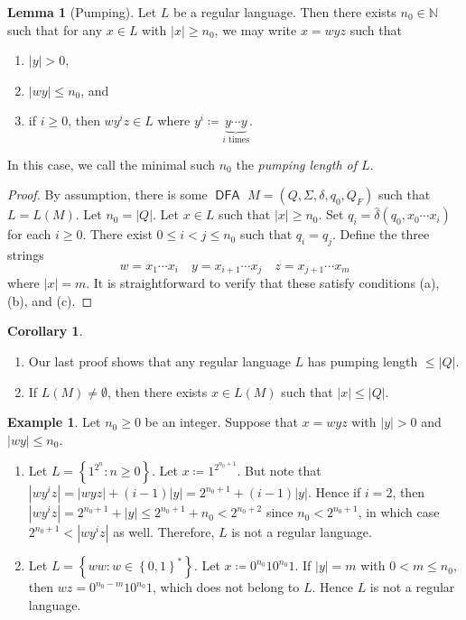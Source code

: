 \documentclass[10pt,letterpaper,cm]{nupset}
\theoremstyle{definition}
\newtheorem{exmp}[definition]{Example}
\theoremstyle{theorem}
\newtheorem{lemma}[definition]{Lemma}
\newtheorem{corollary}[definition]{Corollary}
\theoremstyle{remark}
\newcommand{\N}{\mathbb N}
\newcommand{\1}{\mathbf{1}}
\newcommand{\0}{\vec 0}
\DeclareMathOperator{\DFA}{\mathsf{DFA}}
\begin{document}
\begin{lemma}[Pumping] Let $L$ be a regular language. Then there exists $n_0 \in \N$ such that for any $x\in L$ with $\lvert{x}\rvert\geq n_0$, we may write $x=wyz$ such that
\begin{enumerate}[label=(\alph*)]
\item $\lvert{y}\rvert >0$,
\item $|wy|\leq n_0$, and
\item if $i\geq 0$, then $wy^iz \in L$ where $y^i \coloneqq \underbrace{y\cdots y}_{i \text{ times}}$.
\end{enumerate}
In this case, we call the minimal such $n_0$ the \textit{pumping length of $L$}.
\end{lemma}
\begin{proof}
By assumption, there is some $\DFA$ $M = (Q, \Sigma, \delta, q_0, Q_F)$ such that $L = L(M)$. Let $n_0 = |Q|$. Let $x\in L$ such that $\lvert{x}\rvert\geq n_0$. Set $q_i = \hat{\delta}(q_0, x_0 \cdots x_i)$ for each $i\geq 0$.  There exist $0\leq i<j \leq n_0$ such that $q_i = q_j$. Define the three strings $$w= x_1\cdots x_i \quad  y= x_{i+1}\cdots x_j \quad z= x_{j+1} \cdots x_m$$ where $\lvert{x}\rvert = m$. It is straightforward to verify that these satisfy conditions (a), (b), and (c).
\end{proof}
\begin{corollary} $ $
\begin{enumerate} 
\item Our last proof shows that any regular language $L$ has pumping length $\leq |Q|$.
\item If $L(M) \ne \emptyset$, then there exists $x\in L(M)$ such that $\lvert{x}\rvert \leq |Q|$.
\end{enumerate}
\end{corollary}

\begin{exmp} Let $n_0\geq 0$ be an integer. Suppose that $x=wyz$ with $\lvert{y}\rvert >0$ and $|wy|\leq n_0$.
\begin{enumerate}
\item Let $L=  \left\{ 1^{2^n} : n\geq 0\right\}$. Let $x\coloneqq 1^{2^{n_0+1}}$.  But note that $|wy^iz| = |wyz| + (i-1)\lvert{y}\rvert = 2^{n_0+1} + (i-1)\lvert{y}\rvert$. Hence if $i=2$, then $|wy^i z| = 2^{n_0+1} +\lvert{y}\rvert \leq 2^{n_0+1} +n_0 < 2^{n_0+2}$ since $n_0 < 2^{n_0+1}$, in which case $2^{n_0+1} < |wy^iz|$ as well. Therefore, $L$ is not a regular language. 
\item Let $L = \left\{ ww : w \in \left\{0,1\right\}^{\ast}\right\}$. Let $x\coloneqq 0^{n_0}10^{n_0}1$. If $\lvert{y}\rvert= m$ with $0<m\leq n_0$,  then $wz= 0^{n_0-m}10^{n_0}1$, which does not belong to $L$. Hence $L$ is not a regular language. 
\end{enumerate}
\end{exmp}
\end{document}
